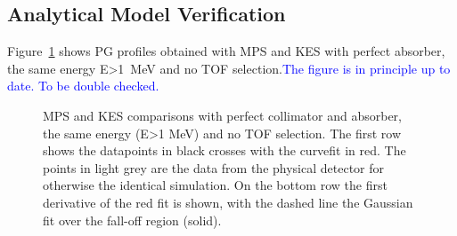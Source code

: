 \documentclass[a4paper,english,12pt]{article}
\newcommand{\et}[2][blue]{\textcolor{#1}{#2}}
\begin{document}
\subsection{Analytical Model Verification}

Figure~\ref{fig:PGprofileFairComp} shows PG profiles obtained with MPS and KES with perfect absorber, the same energy E>1~MeV and no TOF selection.\et{The figure is in principle up to date. To be double checked.}

\begin{figure}[!htp]
  \centering
  \quad
  \caption{\label{fig:PGprofileFairComp} MPS and KES comparisons with perfect collimator and absorber, the same energy (E>1 MeV) and no TOF selection. The first row shows the datapoints in black crosses with the curvefit in red. The points in light grey are the data from the physical detector for otherwise the identical simulation. On the bottom row the first derivative of the red fit is shown, with the dashed line the Gaussian fit over the fall-off region (solid). }
\end{figure}  


\end{document}
